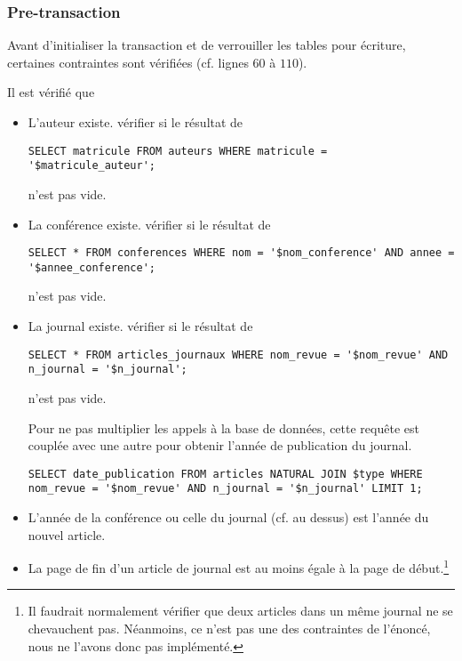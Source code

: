 \documentclass[a4paper, 12pt]{article}
\begin{document}
    \subsubsection{Pre-transaction}
    Avant d'initialiser la transaction et de verrouiller les tables pour écriture, certaines contraintes sont vérifiées (cf. lignes $60$ à $110$). \par
    Il est vérifié que
    \begin{itemize}[leftmargin=*]
        \item L'auteur existe. \Cad{} vérifier si le résultat de
        \begin{lstlisting}[style=sql, gobble=12]
            SELECT matricule FROM auteurs WHERE matricule = '$matricule_auteur';
        \end{lstlisting}
        n'est pas vide.
        \item La conférence existe. \Cad{} vérifier si le résultat de
        \begin{lstlisting}[style=sql, gobble=12]
            SELECT * FROM conferences WHERE nom = '$nom_conference' AND annee = '$annee_conference';
        \end{lstlisting}
        n'est pas vide.
        \item La journal existe. \Cad{} vérifier si le résultat de
        \begin{lstlisting}[style=sql, gobble=12]
            SELECT * FROM articles_journaux WHERE nom_revue = '$nom_revue' AND n_journal = '$n_journal';
        \end{lstlisting}
        n'est pas vide. \par
        Pour ne pas multiplier les appels à la base de données, cette requête est couplée avec une autre pour obtenir l'année de publication du journal.
        \begin{lstlisting}[style=sql, gobble=12]
            SELECT date_publication FROM articles NATURAL JOIN $type WHERE nom_revue = '$nom_revue' AND n_journal = '$n_journal' LIMIT 1;
        \end{lstlisting}
        \item L'année de la conférence ou celle du journal (cf. au dessus) est l'année du nouvel article.
        \item La page de fin d'un article de journal est au moins égale à la page de début.\footnote{Il faudrait normalement vérifier que deux articles dans un même journal ne se chevauchent pas. Néanmoins, ce n'est pas une des contraintes de l'énoncé, nous ne l'avons donc pas implémenté.}
    \end{itemize}
\end{document}
